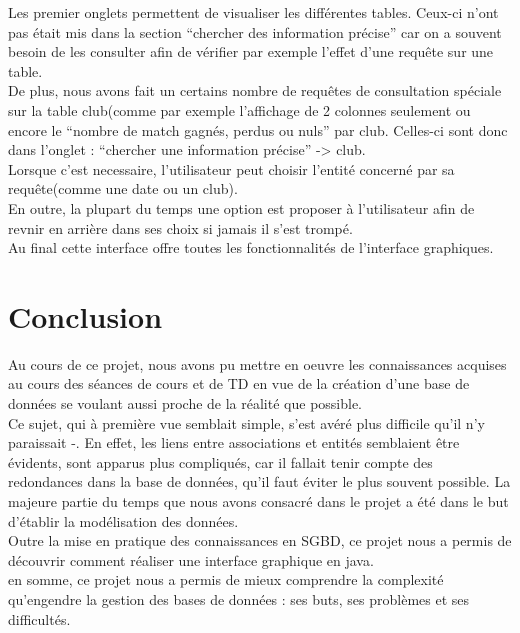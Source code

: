 \documentclass{article}
\begin{document}
Les premier onglets permettent de visualiser les différentes tables. Ceux-ci n'ont pas était mis dans la section ``chercher des information précise'' car on a souvent besoin de les consulter afin de vérifier par exemple l'effet d'une requête sur une table.\\

De plus, nous avons fait un certains nombre de requêtes de consultation spéciale sur la table club(comme par exemple l'affichage de 2 colonnes seulement ou encore le ``nombre de match gagnés, perdus ou nuls'' par club. Celles-ci sont donc dans l'onglet : ``chercher une information précise'' -> club.\\
Lorsque c'est necessaire, l'utilisateur peut choisir l'entité concerné par sa requête(comme une date ou un club).\\

En outre, la plupart du temps une option est proposer à l'utilisateur afin de revnir en arrière dans ses choix si jamais il s'est trompé.\\

Au final cette interface offre toutes les fonctionnalités de l'interface graphiques. \\


\section*{Conclusion}
Au cours de ce projet, nous avons pu mettre en oeuvre les connaissances acquises au cours des séances de cours et de TD en vue de la création d'une base de données se voulant aussi proche de la réalité que possible. \\

Ce sujet, qui à première vue semblait simple, s'est avéré plus difficile qu'il n'y paraissait -. En effet, les liens entre associations et entités semblaient être évidents, sont apparus plus compliqués, car il fallait tenir compte des redondances dans la base de données, qu'il faut éviter le plus souvent possible. La majeure partie du temps que nous avons consacré dans le projet a été dans le but d'établir la modélisation des données.  \\

Outre la mise en pratique des connaissances en SGBD, ce projet nous a permis de découvrir comment réaliser une interface graphique en java. \\

en somme, ce projet nous a permis de mieux comprendre la complexité qu'engendre la gestion des bases de données : ses buts, ses problèmes et ses difficultés. 
\end{document}
